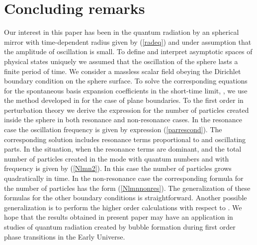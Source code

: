 \documentclass[a4paper,11pt]{article}
\begin{document}
\section{Concluding remarks}

Our interest in this paper has been in the quantum radiation by an
spherical mirror with time-dependent radius given by (\ref{radeq})
and under assumption that the amplitude of oscillation is small.
To define and interpret asymptotic spaces of physical states
uniquely we assumed that the oscillation of the sphere lasts a
finite period of time. We consider a massless scalar field obeying
the Dirichlet boundary condition on the sphere surface. To solve
the corresponding equations for the spontaneous basis expansion
coefficients in the short-time limit, \coordHE{},
we use the method developed in \cite{Ji} for the case of plane
boundaries. To the first order in perturbation theory we derive
the expression for the number of particles created inside the
sphere in both resonance and non-resonance cases. In the resonance
case the oscillation frequency is given by expression
(\ref{parrescond}). The corresponding solution includes resonance
terms proportional to \coordHE{} and oscillating parts. In the situation,
when \coordHE{} the resonance terms are dominant, and the
total number of particles created in the mode with quantum numbers
\coordHE{} and with frequency \coordHE{} is given by
(\ref{Nlmn2}). In this case the number of particles grows
quadratically in time. In the non-resonance case the corresponding
formula for the number of particles has the form
(\ref{Nlmnnonres}). The generalization of these formulas for the
other boundary conditions is straightforward. Another possible
generalization is to perform the higher order calculations with
respect to \myHighlight{$\varepsilon $}\coordHE{}. We hope that the results obtained in
present paper may have an application in studies of quantum
radiation created by bubble formation during first order phase
transitions in the Early Universe.
\end{document}
